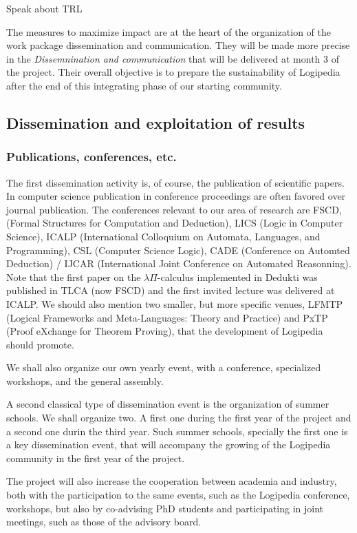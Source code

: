 {\color{red} Speak about TRL}

The measures to maximize impact are at the heart of the organization
of the work package dissemination and communication. They will be made
more precise in the {\em Dissemnination and communication} that will
be delivered at month 3 of the project. Their overall objective is to
prepare the sustainability of Logipedia after the end of this
integrating phase of our starting community.

\subsection{Dissemination and exploitation of results}
\label{sec:dissemination}

\subsubsection*{Publications, conferences, etc.}

The first dissemination activity is, of course, the publication of
scientific papers. In computer science publication in conference
proceedings are often favored over journal publication. The
conferences relevant to our area of research are FSCD, (Formal
Structures for Computation and Deduction), LICS (Logic in Computer
Science), ICALP (International Colloquium on Automata, Languages, and
Programming), CSL (Computer Science Logic), CADE (Conference on
Automted Deduction) / IJCAR (International Joint Conference on
Automated Reasonning). Note that the first paper on the $\lambda
\Pi$-calculus implemented in Dedukti was published in TLCA (now FSCD)
and the first invited lecture was delivered at ICALP. We should also
mention two smaller, but more specific venues, LFMTP (Logical
Frameworks and Meta-Languages: Theory and Practice) and PxTP (Proof
eXchange for Theorem Proving), that the development of Logipedia
should promote.

We shall also organize our own yearly event, with a conference,
specialized workshops, and the general assembly.

A second classical type of dissemination event is the organization of
summer schools. We shall organize two. A first one during the first
year of the project and a second one durin the third year. Such summer
schools, specially the first one is a key dissemination event, that
will accompany the growing of the Logipedia community in the first
year of the project.

The project will also increase the cooperation between academia and
industry, both with the participation to the same events, such as the
Logipedia conference, workshops, but also by co-advising PhD students
and participating in joint meetings, such as those of the advisory
board.

